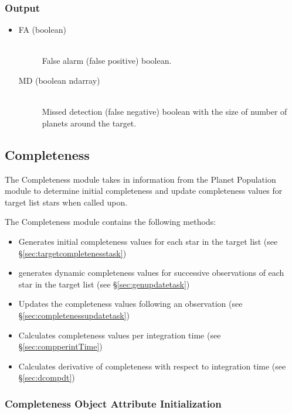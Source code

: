 \documentclass[cleanfoot]{asme2ej}
\begin{document}
\subsubsection*{Output}
\begin{itemize}
\item 
\begin{description}
    \item[FA (boolean)] \hfill \\ False alarm (false positive) boolean.
    \item[MD (boolean ndarray)] \hfill \\ Missed detection (false negative) boolean with the size of number of planets around the target.
\end{description}
\end{itemize}



\subsection{Completeness}\label{sec:completeness}
The Completeness module takes in information from the Planet Population module to determine initial completeness and update completeness values for target list stars when called upon.

The Completeness module contains the following methods:
\begin{itemize}[leftmargin=2in,font={\ttfamily}]
    \item[\texttt target\_completeness] Generates initial completeness values for each star in the target list (see \S\ref{sec:targetcompletenesstask})
    \item[\texttt gen\_update] generates dynamic completeness values for successive observations of each star in the target list  (see \S\ref{sec:genupdatetask})
    \item[\texttt completeness\_update] Updates the completeness values following an observation (see \S\ref{sec:completenessupdatetask})
    \item[\texttt comp\_per\_intTime] Calculates completeness values per integration time (see \S\ref{sec:compperintTime}) 
    \item[\texttt dcomp\_dt] Calculates derivative of completeness with respect to integration time (see \S\ref{sec:dcompdt})
\end{itemize}

\subsubsection{Completeness Object Attribute Initialization}
\end{document}
